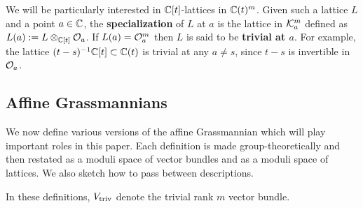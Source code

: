 \documentclass{article} %
\begin{document}
We will be particularly interested in $\mathbb C[t]$-lattices in $ \mathbb C(t)^m$. 
Given such a lattice $ L $ and a point $ a \in \mathbb C$, the \textbf{specialization} of $ L $ at $ a $ is the lattice in $\mathcal K_a^m$ defined as $ L(a) := L \otimes_{\mathbb C[t]} \mathcal O_a $. 
If $L(a) = \mathcal O_a^m$ then $L$ is said to be \textbf{trivial at $a$}. 
For example, the lattice $(t-s)^{-1}\mathbb C[t] \subset \mathbb C(t)$ is trivial at any $a\ne s$, since $ t-s $ is invertible in $ \mathcal O_a$. 





\subsection{Affine Grassmannians} 
\label{ss:affgrs}
% 
We now define various versions of the affine Grassmannian which will play important roles in this paper. 
% 
Each definition is made group-theoretically and then restated as a moduli space of vector bundles and as a moduli space of lattices.
% 
We also sketch how to pass between descriptions.  

In these definitions, $ V_{\mathrm{triv}}$ denote the trivial rank $ m $ vector bundle. 

\end{document}
